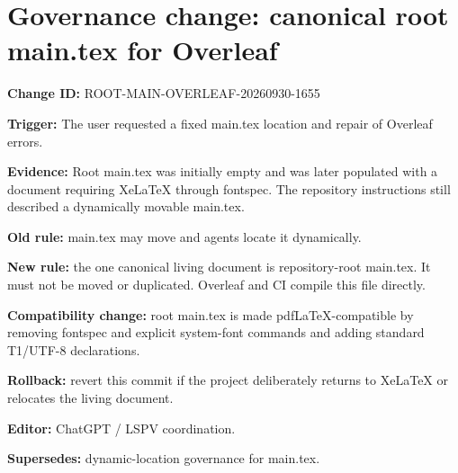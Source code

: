 \documentclass[11pt]{article}
\begin{document}
\section*{Governance change: canonical root main.tex for Overleaf}

\textbf{Change ID:} ROOT-MAIN-OVERLEAF-20260930-1655

\textbf{Trigger:} The user requested a fixed main.tex location and repair of Overleaf errors.

\textbf{Evidence:} Root main.tex was initially empty and was later populated with a document requiring XeLaTeX through fontspec. The repository instructions still described a dynamically movable main.tex.

\textbf{Old rule:} main.tex may move and agents locate it dynamically.

\textbf{New rule:} the one canonical living document is repository-root main.tex. It must not be moved or duplicated. Overleaf and CI compile this file directly.

\textbf{Compatibility change:} root main.tex is made pdfLaTeX-compatible by removing fontspec and explicit system-font commands and adding standard T1/UTF-8 declarations.

\textbf{Rollback:} revert this commit if the project deliberately returns to XeLaTeX or relocates the living document.

\textbf{Editor:} ChatGPT / LSPV coordination.

\textbf{Supersedes:} dynamic-location governance for main.tex.
\end{document}
